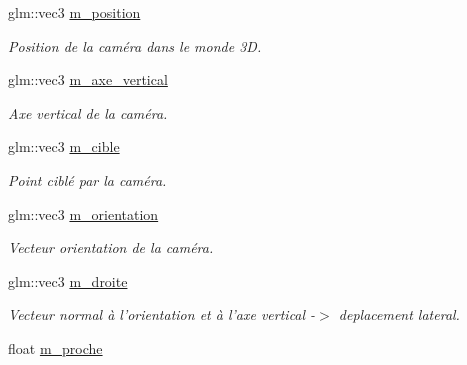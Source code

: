 \begin{DoxyCompactItemize}
\item 
\hypertarget{classAbstractCamera_a0a7cf1e2ab478c3b2a375fdd8d298cdc}{glm\-::vec3 \hyperlink{classAbstractCamera_a0a7cf1e2ab478c3b2a375fdd8d298cdc}{m\-\_\-position}}\label{classAbstractCamera_a0a7cf1e2ab478c3b2a375fdd8d298cdc}

\begin{DoxyCompactList}\small\item\em Position de la caméra dans le monde 3\-D. \end{DoxyCompactList}\item 
\hypertarget{classAbstractCamera_a9809fe9917c78f701bbda73a116b11cb}{glm\-::vec3 \hyperlink{classAbstractCamera_a9809fe9917c78f701bbda73a116b11cb}{m\-\_\-axe\-\_\-vertical}}\label{classAbstractCamera_a9809fe9917c78f701bbda73a116b11cb}

\begin{DoxyCompactList}\small\item\em Axe vertical de la caméra. \end{DoxyCompactList}\item 
\hypertarget{classAbstractCamera_aee9a00d7b11559a5448abbfa751a6d96}{glm\-::vec3 \hyperlink{classAbstractCamera_aee9a00d7b11559a5448abbfa751a6d96}{m\-\_\-cible}}\label{classAbstractCamera_aee9a00d7b11559a5448abbfa751a6d96}

\begin{DoxyCompactList}\small\item\em Point ciblé par la caméra. \end{DoxyCompactList}\item 
\hypertarget{classAbstractCamera_a16b6278ac154b9869c605131bab89d74}{glm\-::vec3 \hyperlink{classAbstractCamera_a16b6278ac154b9869c605131bab89d74}{m\-\_\-orientation}}\label{classAbstractCamera_a16b6278ac154b9869c605131bab89d74}

\begin{DoxyCompactList}\small\item\em Vecteur orientation de la caméra. \end{DoxyCompactList}\item 
\hypertarget{classAbstractCamera_a67b386323421b56e7e123d74c0d8e990}{glm\-::vec3 \hyperlink{classAbstractCamera_a67b386323421b56e7e123d74c0d8e990}{m\-\_\-droite}}\label{classAbstractCamera_a67b386323421b56e7e123d74c0d8e990}

\begin{DoxyCompactList}\small\item\em Vecteur normal à l'orientation et à l'axe vertical -\/$>$ deplacement lateral. \end{DoxyCompactList}\item 
\hypertarget{classAbstractCamera_a302613d43b644880473e964ede5c6094}{float \hyperlink{classAbstractCamera_a302613d43b644880473e964ede5c6094}{m\-\_\-proche}}\label{classAbstractCamera_a302613d43b644880473e964ede5c6094}


\end{DoxyCompactItemize}
